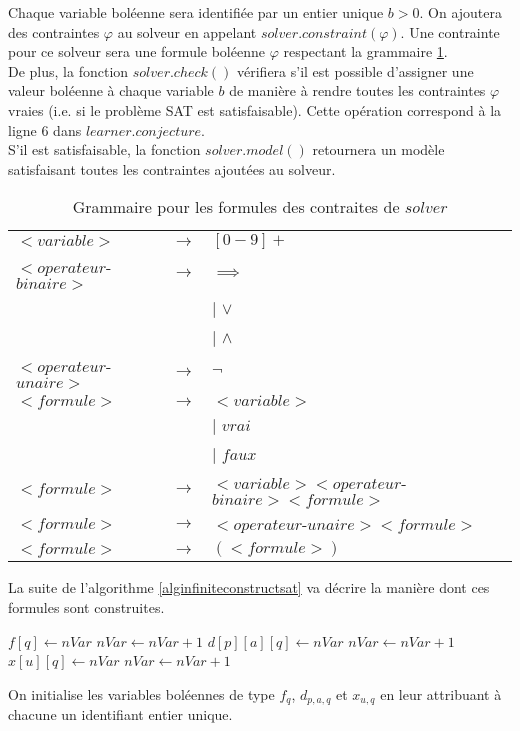 \documentclass[12pt,a4paper,oneside,titlepage]{report}
\begin{document}
\noindent Chaque variable boléenne sera identifiée par un entier unique $b>
0$. On ajoutera des contraintes $\varphi$ au solveur en appelant $solver.constraint(\varphi)$. Une contrainte pour ce solveur sera une formule boléenne $\varphi$ respectant la grammaire \ref{boolgrammar}.\\
De plus, la fonction $solver.check()$ vérifiera s'il est possible d'assigner une valeur boléenne à chaque variable $b$ de manière à rendre toutes les contraintes $\varphi$ vraies (i.e. si le problème SAT est satisfaisable). Cette opération correspond à la ligne $6$ dans $learner.conjecture$.\\
S'il est satisfaisable, la fonction $solver.model()$ retournera un modèle satisfaisant toutes les contraintes ajoutées au solveur.\\
\begin{center}
\begin{table}[H]
\begin{tabular}{|lcl|}
\hline
$<variable>$ &$\rightarrow$ & $[0-9]+$\\
$<operateur$-$binaire>$ & $\rightarrow$ 	& $\implies$\\
										&&$|$ $\lor$\\
										&&$|$ $\land$\\
$<operateur$-$unaire>$ & $\rightarrow$ 	& $\neg$\\
$<formule>$ & $\rightarrow$ & $<variable>$\\
								&& $|$ $vrai$\\
								&& $|$ $faux$\\			
$<formule>$ & $\rightarrow$ & $<variable><operateur$-$binaire><formule>$\\
$<formule>$ & $\rightarrow$ & $<operateur$-$unaire><formule>$\\
$<formule>$ & $\rightarrow$ & $(<formule>)$\\
\hline
\end{tabular}
\caption{\label{boolgrammar}Grammaire pour les formules des contraites de $solver$}
\end{table}
\end{center}
\noindent La suite de l'algorithme \ref{alginfiniteconstructsat} va décrire la manière dont ces formules sont construites.
\begin{algorithm}[H]
\begin{algorithmic}[1]
	\State $f[q]\gets nVar$
	\State $nVar\gets nVar+1$
\EndFor
{}
			\State $d[p][a][q]\gets nVar$
			\State $nVar\gets nVar+1$
		\EndFor
	\EndFor
\EndFor
{}
		\State $x[u][q]\gets nVar$
		\State $nVar\gets nVar+1$
	\EndFor
\EndFor
{}
\end{algorithmic}
\end{algorithm}
\noindent On initialise les variables boléennes de type $f_q$, $d_{p,a,q}$ et $x_{u,q}$ en leur attribuant à chacune un identifiant entier unique.
\end{document}
